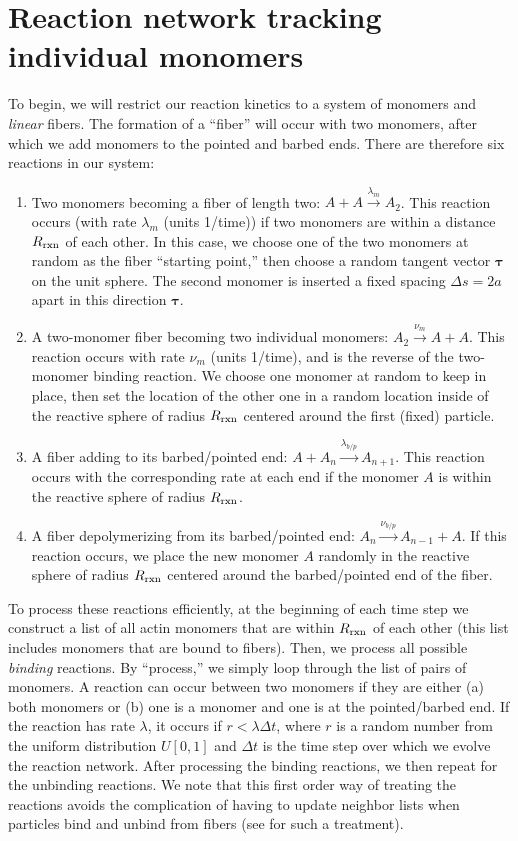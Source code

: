 \documentclass[11pt]{article}
\newcommand{\V}[1]{\boldsymbol{#1}}                 %
\begin{document}
\section{Reaction network tracking individual monomers \label{sec:RTM}}
To begin, we will restrict our reaction kinetics to a system of monomers and \emph{linear} fibers. The formation of a ``fiber'' will occur with two monomers, after which we add monomers to the pointed and barbed ends. There are therefore six reactions in our system:
\begin{enumerate}
\item Two monomers becoming a fiber of length two: $A+A \xrightarrow{\lambda_m} A_2$. This reaction occurs (with rate $\lambda_m$ (units 1/time)) if two monomers are within a distance $R_\text{rxn}$ of each other. In this case, we choose one of the two monomers at random as the fiber ``starting point,'' then choose a random tangent vector $\V{\tau}$ on the unit sphere. The second monomer is inserted a fixed spacing $\Delta s=2a$ apart in this direction $\V{\tau}$.
\item A two-monomer fiber becoming two individual monomers: $A_2 \xrightarrow{\nu_m} A+A$. This reaction occurs with rate $\nu_m$ (units 1/time), and is the reverse of the two-monomer binding reaction. We choose one monomer at random to keep in place, then set the location of the other one in a random location inside of the reactive sphere of radius $R_\text{rxn}$ centered around the first (fixed) particle.
\item A fiber adding to its barbed/pointed end: $A + A_n \xrightarrow{\lambda_{b/p}} A_{n+1}$. This reaction occurs with the corresponding rate at each end if the monomer $A$ is within the reactive sphere of radius $R_\text{rxn}$. 
\item A fiber depolymerizing from its barbed/pointed end: $A_n \xrightarrow{\nu_{b/p}} A_{n-1}+A$. If this reaction occurs, we place the new monomer $A$ randomly in the reactive sphere of radius $R_\text{rxn}$ centered around the barbed/pointed end of the fiber.
\end{enumerate}
To process these reactions efficiently, at the beginning of each time step we construct a list of all actin monomers that are within $R_\text{rxn}$ of each other (this list includes monomers that are bound to fibers). Then, we process all possible \emph{binding} reactions. By ``process,'' we simply loop through the list of pairs of monomers. A reaction can occur between two monomers if they are either (a) both monomers or (b) one is a monomer and one is at the pointed/barbed end. If the reaction has rate $\lambda$, it occurs if $r < \lambda \Delta t$, where $r$ is a random number from the uniform distribution $U[0,1]$ and $\Delta t$ is the time step over which we evolve the reaction network. After processing the binding reactions, we then repeat for the unbinding reactions. We note that this first order way of treating the reactions avoids the complication of having to update neighbor lists when particles bind and unbind from fibers (see \cite{donev2018efficient} for such a treatment). 
\end{document}

